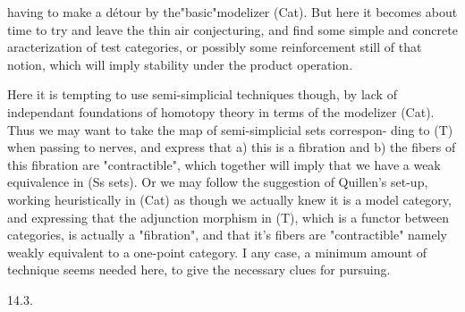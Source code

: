 having to make a détour by the"basic"modelizer (Cat). But here it becomes
about time to try and leave the thin air conjecturing, and find some simple
 and concrete aracterization of test categories,  or possibly some
reinforcement still of that notion, which will imply stability under the
product operation.

Here it is tempting to use semi-simplicial techniques though, by lack
of independant foundations of homotopy theory in terms of the modelizer
(Cat). Thus we may want to take the map of semi-simplicial sets correspon-%
ding to (T) when passing to nerves, and express that a) this is a fibration
and b) the fibers of this fibration are "contractible", which together
will imply that we have a weak equivalence in (Ss sets). Or we may follow
the suggestion of Quillen's set-up, working heuristically in (Cat) as though
we actually knew it is a model category, and expressing that the adjunction
morphism in (T), which is a functor between categories, is actually a
"fibration", and that it's fibers are "contractible" namely weakly equivalent
to a one-point category. I any case, a minimum amount of technique seems
needed here, to give the necessary clues for pursuing.

14.3.

